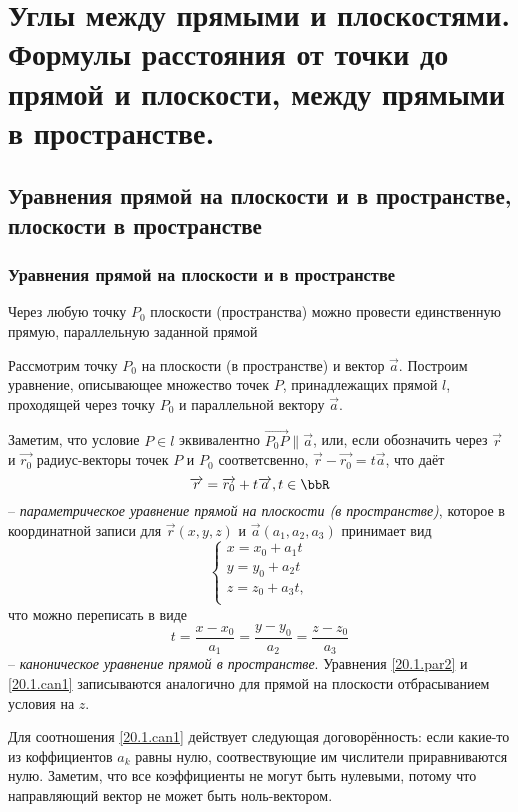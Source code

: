 \chapter{Углы между прямыми и плоскостями. Формулы расстояния от точки до прямой и плоскости, между прямыми в пространстве.}
\section{Уравнения прямой на плоскости и в пространстве, плоскости в пространстве}
\subsection{Уравнения прямой на плоскости и в пространстве}
\begin{axiome} 
  Через любую точку $P_0$ плоскости (пространства) можно провести единственную прямую, параллельную заданной прямой
\end{axiome}
  Рассмотрим точку $P_0$ на плоскости (в пространстве) и вектор $\overrightarrow{a}$. Построим уравнение, описывающее множество точек $P$, принадлежащих прямой $l$, проходящей через точку $P_0$ и параллельной вектору $\overrightarrow{a}$.

  Заметим, что условие $P \in l$ эквивалентно $ \overrightarrow{P_0P} \parallel \overrightarrow{a} $, или, если обозначить через $\overrightarrow{r}$ и $\overrightarrow{r_0}$ радиус-векторы точек $P$ и $P_0$ соответсвенно, $\overrightarrow{r}-\overrightarrow{r_0} = t\overrightarrow{a}$, что даёт
\begin{equation}\label{20.1.par1}
\overrightarrow{r}=\overrightarrow{r_0}+t\overrightarrow{a}, t \in \bbR
\end{equation}
-- \textit{параметрическое уравнение прямой на плоскости (в пространстве)}, которое в координатной записи для $\overrightarrow{r}(x,y,z)$ и $\overrightarrow{a}(a_1,a_2,a_3)$ принимает вид
$$
\begin{cases}\label{20.1.par2}
x=x_0+a_1t\\
y=y_0+a_2t\\
z=z_0+a_3t,\\
\end{cases}
$$
что можно переписать в виде
\begin{equation}\label{20.1.can1}
t=\frac{x-x_0}{a_1}=\frac{y-y_0}{a_2}=\frac{z-z_0}{a_3}
\end{equation}
-- \textit{каноническое уравнение прямой в пространстве}.
  Уравнения \ref{20.1.par2} и \ref{20.1.can1} записываются аналогично для прямой на плоскости отбрасыванием условия на $z$.
  \begin{notion}
  Для соотношения \ref{20.1.can1} действует следующая договорённость: если какие-то из коффициентов $a_k$ равны нулю, соотвествующие им числители приравниваются нулю. Заметим, что все коэффициенты не могут быть нулевыми, потому что направляющий вектор не может быть ноль-вектором.
  \end{notion}
  
